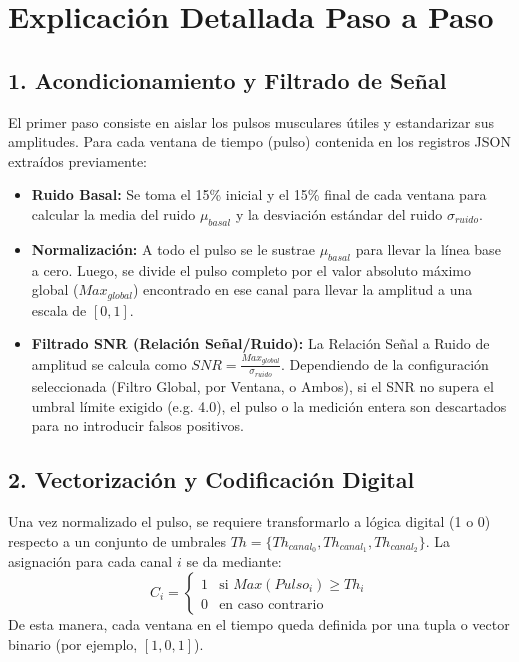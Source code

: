 \documentclass[12pt, a4paper]{article}
\begin{document}
\begin{center}
\end{center}

\newpage

\section{Explicación Detallada Paso a Paso}

\subsection{1. Acondicionamiento y Filtrado de Señal}
El primer paso consiste en aislar los pulsos musculares útiles y estandarizar sus amplitudes. Para cada ventana de tiempo (pulso) contenida en los registros JSON extraídos previamente:
\begin{itemize}
    \item \textbf{Ruido Basal:} Se toma el 15\% inicial y el 15\% final de cada ventana para calcular la media del ruido $\mu_{basal}$ y la desviación estándar del ruido $\sigma_{ruido}$.
    \item \textbf{Normalización:} A todo el pulso se le sustrae $\mu_{basal}$ para llevar la línea base a cero. Luego, se divide el pulso completo por el valor absoluto máximo global ($Max_{global}$) encontrado en ese canal para llevar la amplitud a una escala de $[0, 1]$.
    \item \textbf{Filtrado SNR (Relación Señal/Ruido):} La Relación Señal a Ruido de amplitud se calcula como $SNR = \frac{Max_{global}}{\sigma_{ruido}}$. Dependiendo de la configuración seleccionada (Filtro Global, por Ventana, o Ambos), si el SNR no supera el umbral límite exigido (e.g. 4.0), el pulso o la medición entera son descartados para no introducir falsos positivos.
\end{itemize}

\subsection{2. Vectorización y Codificación Digital}
Una vez normalizado el pulso, se requiere transformarlo a lógica digital (1 o 0) respecto a un conjunto de umbrales $Th = \{Th_{canal_0}, Th_{canal_1}, Th_{canal_2}\}$.
La asignación para cada canal $i$ se da mediante:
\[
C_i = 
\begin{cases} 
1 & \text{si } Max(Pulso_i) \ge Th_i \\
0 & \text{en caso contrario}
\end{cases}
\]
De esta manera, cada ventana en el tiempo queda definida por una tupla o vector binario (por ejemplo, $[1, 0, 1]$).
\end{document}

